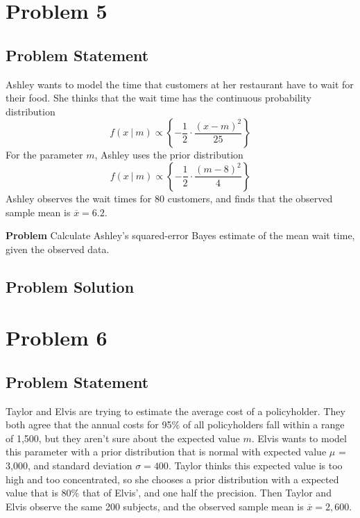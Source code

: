 \documentclass[12pt]{article}
\theoremstyle{definition}
\begin{document}
\newpage
\section*{Problem 5}

\subsection*{Problem Statement}

Ashley wants to model the time that customers at her restaurant have to wait for their food. She thinks that the wait time has the continuous probability distribution
$$
f(x\ |\ m) \propto \left \{ - \frac{1}{2} \cdot \frac{ (x - m)^2}{25} \right \}
$$
For the parameter $m$, Ashley uses the prior distribution
$$
f(x\ |\ m) \propto \left \{ - \frac{1}{2} \cdot \frac{ (m - 8)^2}{4} \right \}
$$
Ashley observes the wait times for 80 customers, and finds that the observed sample mean is $\overline{x} = 6.2$.

\bigskip
\noindent
{\bf Problem} Calculate Ashley's squared-error Bayes estimate of the mean wait time, given the observed data.


\subsection*{Problem Solution}




\newpage
\section*{Problem 6}

\subsection*{Problem Statement}

Taylor and Elvis are trying to estimate the average cost of a policyholder. They both agree that the annual costs for 95\% of all policyholders fall within a range of 1,500, but they aren't sure about the expected value $m$. Elvis wants to model this parameter with a prior distribution that is normal with expected value $\mu$ = 3,000, and standard deviation $\sigma = 400$. Taylor thinks this expected value is too high and too concentrated, so she chooses a prior distribution with a expected value that is 80\% that of Elvis', and one half the precision. Then Taylor and Elvis observe the same 200 subjects, and the observed sample mean is $\overline{x} = 2,600$.
\end{document}
